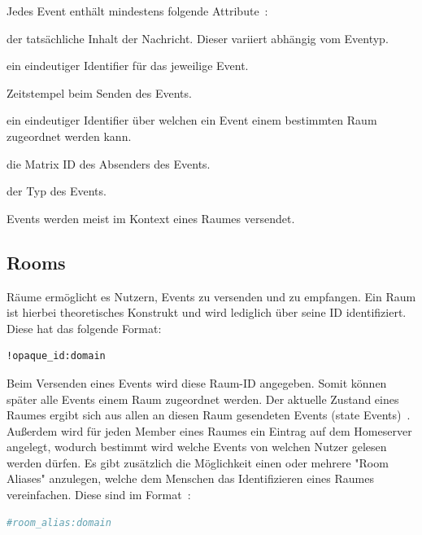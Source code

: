     Jedes Event enthält mindestens folgende Attribute~\cite{eventformat}:
    \begin{description}[leftmargin=!,labelwidth=3.5cm]
        \item [content] der tatsächliche Inhalt der Nachricht. Dieser variiert abhängig vom Eventyp.
        \item [event\_id] ein eindeutiger Identifier für das jeweilige Event.
        \item [origin\_server\_ts] Zeitstempel beim Senden des Events.
        \item [room\_id] ein eindeutiger Identifier über welchen ein Event einem bestimmten Raum zugeordnet werden kann.
        \item [sender] die Matrix ID des Absenders des Events.
        \item [type] der Typ des Events.
    \end{description}

    Events werden meist im Kontext eines Raumes versendet.

    \newpage
    \subsection{Rooms}\label{subsec:rooms}
    Räume ermöglicht es Nutzern, Events zu versenden und zu empfangen.
    Ein Raum ist hierbei theoretisches Konstrukt und wird lediglich über seine ID identifiziert.
    Diese hat das folgende Format:
    \begin{lstlisting}[language=bash,label={lst:roomid}]
        !opaque_id:domain
    \end{lstlisting}
    Beim Versenden eines Events wird diese Raum-ID angegeben.
    Somit können später alle Events einem Raum zugeordnet werden.
    Der aktuelle Zustand eines Raumes ergibt sich aus allen an diesen Raum gesendeten Events (state Events)~\cite{rooms}.
    Außerdem wird für jeden Member eines Raumes ein Eintrag auf dem Homeserver angelegt, wodurch bestimmt wird welche Events von welchen Nutzer gelesen werden dürfen.
    Es gibt zusätzlich die Möglichkeit einen oder mehrere "Room Aliases" anzulegen, welche dem Menschen das Identifizieren eines Raumes vereinfachen.
    Diese sind im Format~\cite{rooms}:
    \begin{lstlisting}[language=bash,label={lst:roomalias}]
        #room_alias:domain
    \end{lstlisting}



